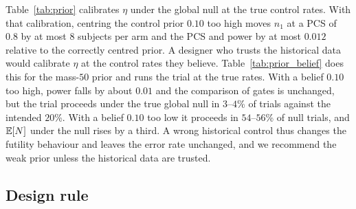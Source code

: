 Table~\ref{tab:prior} calibrates $\eta$ under the global null at the true control rates. With that calibration, centring the control prior $0.10$ too high moves $n_1$ at a PCS of $0.8$ by at most $8$ subjects per arm and the PCS and power by at most $0.012$ relative to the correctly centred prior. A designer who trusts the historical data would calibrate $\eta$ at the control rates they believe. Table~\ref{tab:prior_belief} does this for the mass-$50$ prior and runs the trial at the true rates. With a belief $0.10$ too high, power falls by about $0.01$ and the comparison of gates is unchanged, but the trial proceeds under the true global null in $3$--$4$\% of trials against the intended $20$\%. With a belief $0.10$ too low it proceeds in $54$--$56$\% of null trials, and $\mathbb{E}[N]$ under the null rises by a third. A wrong historical control thus changes the futility behaviour and leaves the error rate unchanged, and we recommend the weak prior unless the historical data are trusted.

\begin{table}
\centering\footnotesize
\caption{The mass-$50$ control prior with $\eta$ calibrated at the control rates the designer believes and the trial run at the true rates ($n_1=100$, $n_{\mathrm{tot}}=350$, $\rho=0.3$).}\label{tab:prior_belief}

\end{table}

\subsection{Design rule}\label{sec:rule}


